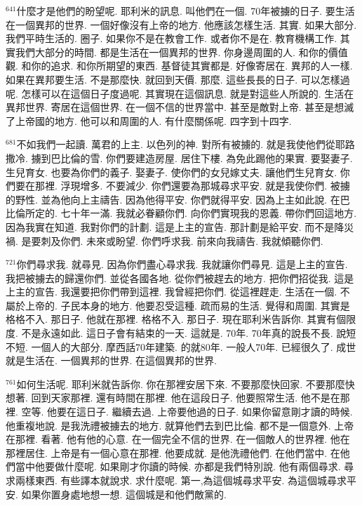 \documentclass{book}
\begin{document}
$^{641}$什麼才是他們的盼望呢.
耶利米的訊息.
叫他們在一個.
70年被擄的日子.
要生活在一個異邦的世界.
一個好像沒有上帝的地方.
他應該怎樣生活.
其實.
如果大部分.
我們平時生活的.
圈子.
如果你不是在教會工作.
或者你不是在.
教育機構工作.
其實我們大部分的時間.
都是生活在一個異邦的世界.
你身邊周圍的人.
和你的價值觀.
和你的追求.
和你所期望的東西.
基督徒其實都是.
好像寄居在.
異邦的人一樣.
如果在異邦要生活.
不是那麼快.
就回到天價.
那麼.
這些長長的日子.
可以怎樣過呢.
怎樣可以在這個日子度過呢.
其實現在這個訊息.
就是對這些人所說的.
生活在異邦世界.
寄居在這個世界.
在一個不信的世界當中.
甚至是敵對上帝.
甚至是想滅了上帝國的地方.
他可以和周圍的人.
有什麼關係呢.
四字到十四字.

$^{681}$不如我們一起讀.
萬君的上主.
以色列的神.
對所有被擄的.
就是我使他們從耶路撒冷.
擄到巴比倫的雪.
你們要建造房屋.
居住下樓.
為免此踢他的果實.
要娶妻子.
生兒育女.
也要為你們的義子.
娶妻子.
使你們的女兒嫁丈夫.
讓他們生兒育女.
你們要在那裡.
浮現增多.
不要減少.
你們還要為那城尋求平安.
就是我使你們.
被擄的野性.
並為他向上主禱告.
因為他得平安.
你們就得平安.
因為上主如此說.
在巴比倫所定的.
七十年一滿.
我就必眷顧你們.
向你們實現我的恩義.
帶你們回這地方.
因為我實在知道.
我對你們的計劃.
這是上主的宣告.
那計劃是給平安.
而不是降災禍.
是要刺及你們.
未來或盼望.
你們呼求我.
前來向我禱告.
我就傾聽你們.

$^{721}$你們尋求我.
就尋見.
因為你們盡心尋求我.
我就讓你們尋見.
這是上主的宣告.
我把被擄去的歸還你們.
並從各國各地.
從你們被趕去的地方.
把你們招從我.
這是上主的宣告.
我還要把你們帶到這裡.
我曾經把你們.
從這裡趕走.
生活在一個.
不屬於上帝的.
子民本身的地方.
他要忍受這種.
疏而易的生活.
覺得和周圍.
其實是格格不入.
那日子.
他就在那裡.
格格不入.
那日子.
現在耶利米告訴你.
其實有個限度.
不是永遠如此.
這日子會有結束的一天.
這就是.
70年.
70年真的說長不長.
說短不短.
一個人的大部分.
摩西話70年建築.
的就80年.
一般人70年.
已經很久了.
成世就是生活在.
一個異邦的世界.
在這個異邦的世界.

$^{761}$如何生活呢.
耶利米就告訴你.
你在那裡安居下來.
不要那麼快回家.
不要那麼快想著.
回到天家那裡.
還有時間在那裡.
他在這段日子.
他要照常生活.
他不是在那裡.
空等.
他要在這日子.
繼續去過.
上帝要他過的日子.
如果你留意剛才讀的時候.
他重複地說.
是我洗禮被擄去的地方.
就算他們去到巴比倫.
都不是一個意外.
上帝在那裡.
看著.
他有他的心意.
在一個完全不信的世界.
在一個敵人的世界裡.
他在那裡居住.
上帝是有一個心意在那裡.
他要成就.
是他洗禮他們.
在他們當中.
在他們當中他要做什麼呢.
如果剛才你讀的時候.
亦都是我們特別說.
他有兩個尋求.
尋求兩樣東西.
有些譯本就說求.
求什麼呢.
第一,為這個城尋求平安.
為這個城尋求平安.
如果你置身處地想一想.
這個城是和他們敵黨的.
\end{document}
